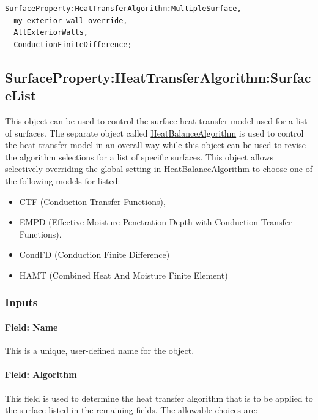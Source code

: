 \begin{lstlisting}
SurfaceProperty:HeatTransferAlgorithm:MultipleSurface,
  my exterior wall override,
  AllExteriorWalls,
  ConductionFiniteDifference;
\end{lstlisting}

\subsection{SurfaceProperty:HeatTransferAlgorithm:SurfaceList}\label{surfacepropertyheattransferalgorithmsurfacelist}

This object can be used to control the surface heat transfer model used for a list of surfaces. The separate object called \hyperref[heatbalancealgorithm]{HeatBalanceAlgorithm} is used to control the heat transfer model in an overall way while this object can be used to revise the algorithm selections for a list of specific surfaces. This object allows selectively overriding the global setting in \hyperref[heatbalancealgorithm]{HeatBalanceAlgorithm} to choose one of the following models for listed:

\begin{itemize}
\item
  CTF (Conduction Transfer Functions),
\item
  EMPD (Effective Moisture Penetration Depth with Conduction Transfer Functions).
\item
  CondFD (Conduction Finite Difference)
\item
  HAMT (Combined Heat And Moisture Finite Element)
\end{itemize}

\subsubsection{Inputs}\label{inputs-2-000}

\paragraph{Field: Name}

This is a unique, user-defined name for the object.

\paragraph{Field: Algorithm}\label{field-algorithm-2}

This field is used to determine the heat transfer algorithm that is to be applied to the surface listed in the remaining fields. The allowable choices are:

